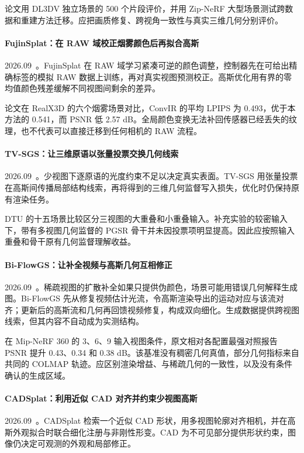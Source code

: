 论文用 DL3DV 独立场景的 500 个片段评价，并用 Zip-NeRF 大型场景测试跨数据和重建方法迁移。应把画质修复、跨视角一致性与真实三维几何分别评价。

\paragraph{FujinSplat：在 RAW 域校正烟雾颜色后再拟合高斯}
2026.09~\cite{2609_06017}。FujinSplat 在 RAW 域学习紧凑可逆的颜色调整，控制器先在可给出精确标签的模拟 RAW 数据上训练，再对真实视图预测校正。高斯优化用有界的零均值颜色残差缓解不同视图间剩余的差异。

论文在 RealX3D 的六个烟雾场景对比，ConvIR 的平均 LPIPS 为 0.493，优于本方法的 0.541，而 PSNR 低 2.57 dB。全局颜色变换无法补回传感器已经丢失的纹理，也不代表可以直接迁移到任何相机的 RAW 流程。

\paragraph{TV-SGS：让三维原语以张量投票交换几何线索}
2026.09~\cite{2609_07734}。少视图下逐原语的光度约束不足以决定真实表面。TV-SGS 用张量投票在高斯间传播局部结构线索，再将得到的三维几何监督写入损失，优化时仍保持原有渲染任务。

DTU 的十五场景比较区分三视图的大重叠和小重叠输入。补充实验的较密输入下，带有多视图几何监督的 PGSR 骨干并未因投票项明显提高。因此应按照输入重叠和骨干原有几何监督理解收益。

\paragraph{Bi-FlowGS：让补全视频与高斯几何互相修正}
2026.09~\cite{2609_17039}。稀疏视图的扩散补全如果只提供伪颜色，场景可能用错误几何解释生成图。Bi-FlowGS 先从修复视频估计光流，令高斯渲染导出的运动对应与该流对齐；更新后的高斯流和几何再回馈视频修复，构成双向细化。生成数据提供跨视图线索，但其内容不自动成为实测结构。

在 Mip-NeRF 360 的 3、6、9 输入视图条件，原文相对各配置最强对照报告 PSNR 提升 0.43、0.34 和 0.38 dB。该基准没有稠密几何真值，部分几何指标来自共同的 COLMAP 轨迹。应区别渲染增益、与稀疏几何的一致性，以及没有条件确认的生成区域。

\paragraph{CADSplat：利用近似 CAD 对齐并约束少视图高斯}
2026.09~\cite{2609_18473}。CADSplat 检索一个近似 CAD 形状，用多视图轮廓对齐相机，并在高斯外观拟合时联合细化注册与非刚性形变。CAD 为不可见部分提供形状约束，图像仍决定可观测的外观和局部修正。

